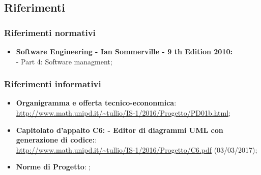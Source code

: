 \documentclass[../PianoDiProgetto.tex]{subfiles}
\begin{document}
		\subsection{Riferimenti}
			\subsubsection{Riferimenti normativi}
    			\begin{itemize}
    			\item \textbf{Software Engineering - Ian Sommerville - 9 th Edition 2010:} \\
    			- Part 4: Software managment; \\
			\end{itemize}
			\subsubsection{Riferimenti informativi}	
				\begin{itemize}
					\item \textbf{Organigramma e offerta tecnico-econonmica}:\\
					\url{http://www.math.unipd.it/~tullio/IS-1/2016/Progetto/PD01b.html};
					\item \textbf{Capitolato d'appalto C6: \progetto - Editor di diagrammi UML con 							generazione di codice:}:\\
					\url{http://www.math.unipd.it/~tullio/IS-1/2016/Progetto/C6.pdf} (03/03/2017);
					\item \textbf{Norme di Progetto}: \normediprogettov;
				\end{itemize}
\end{document}
